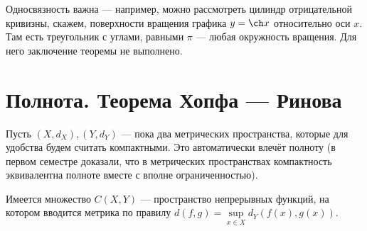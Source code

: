 \documentclass[a4paper]{report}
\begin{document}
    Односвязность важна --- например, можно рассмотреть цилиндр отрицательной кривизны, скажем, поверхности вращения графика $y = \ch x$ относительно оси $x$.
    Там есть треугольник с углами, равными $\pi$ --- любая окружность вращения.
    Для него заключение теоремы не выполнено.
    \section{Полнота. Теорема Хопфа --- Ринова}
    Пусть $(X, d_X), (Y, d_Y)$ --- пока два метрических пространства, которые для удобства будем считать компактными.
    Это автоматически влечёт полноту (в первом семестре доказали, что в метрических пространствах компактность эквивалентна полноте вместе с вполне ограниченностью).

    Имеется множество $C(X, Y)$ --- пространство непрерывных функций, на котором вводится метрика по правилу $d(f, g) = \sup\limits_{x \in X}d_Y(f(x), g(x))$.
\end{document}
